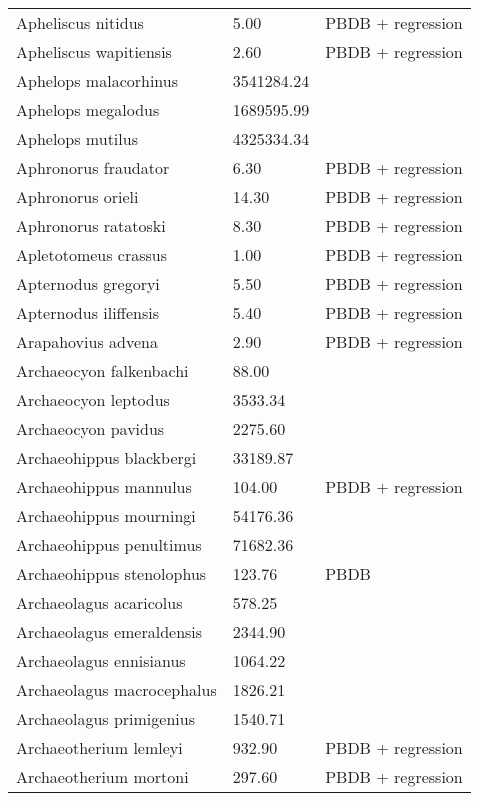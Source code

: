 \documentclass{article}
\begin{document}
\begin{center}
\begin{longtable}{p{} p{} p{}}
    Apheliscus nitidus & 5.00 & PBDB + regression \\ 
    Apheliscus wapitiensis & 2.60 & PBDB + regression \\ 
    Aphelops malacorhinus & 3541284.24 & \cite{Tomiya2013} \\ 
    Aphelops megalodus & 1689595.99 & \cite{Tomiya2013} \\ 
    Aphelops mutilus & 4325334.34 & \cite{Tomiya2013} \\ 
    Aphronorus fraudator & 6.30 & PBDB + regression \\ 
    Aphronorus orieli & 14.30 & PBDB + regression \\ 
    Aphronorus ratatoski & 8.30 & PBDB + regression \\ 
    Apletotomeus crassus & 1.00 & PBDB + regression \\ 
    Apternodus gregoryi & 5.50 & PBDB + regression \\ 
    Apternodus iliffensis & 5.40 & PBDB + regression \\ 
    Arapahovius advena & 2.90 & PBDB + regression \\ 
    Archaeocyon falkenbachi & 88.00 & \cite{Stirton1932} \\ 
    Archaeocyon leptodus & 3533.34 & \cite{Tomiya2013} \\ 
    Archaeocyon pavidus & 2275.60 & \cite{Tomiya2013} \\ 
    Archaeohippus blackbergi & 33189.87 & \cite{Tomiya2013} \\ 
    Archaeohippus mannulus & 104.00 & PBDB + regression \\ 
    Archaeohippus mourningi & 54176.36 & \cite{Tomiya2013} \\ 
    Archaeohippus penultimus & 71682.36 & \cite{Tomiya2013} \\ 
    Archaeohippus stenolophus & 123.76 & PBDB \\ 
    Archaeolagus acaricolus & 578.25 & \cite{Tomiya2013} \\ 
    Archaeolagus emeraldensis & 2344.90 & \cite{Tomiya2013} \\ 
    Archaeolagus ennisianus & 1064.22 & \cite{Tomiya2013} \\ 
    Archaeolagus macrocephalus & 1826.21 & \cite{Tomiya2013} \\ 
    Archaeolagus primigenius & 1540.71 & \cite{Tomiya2013} \\ 
    Archaeotherium lemleyi & 932.90 & PBDB + regression \\ 
    Archaeotherium mortoni & 297.60 & PBDB + regression \\ 

\end{longtable}
\end{center}
\end{document}
